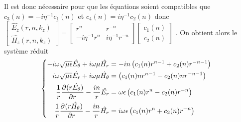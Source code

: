   Il est donc nécessaire pour que les équations soient compatibles que \(c_3(n)=-i\eta^{-1} c_1(n)\) et \(c_4(n) = i\eta^{-1}c_2(n)\) donc \(\begin{bmatrix}\hat{E_z}(r,n,k_z)\\\hat{H_z}(r,n,k_z)\end{bmatrix}=\begin{bmatrix}r^n&r^{-n}\\-i\eta^{-1}r^n&i\eta^{-1}r^{-n}\end{bmatrix}\begin{bmatrix}c_1(n)\\c_2(n)\end{bmatrix}\) . On obtient alors le système réduit
  \begin{align*}
      &\left\lbrace
      \begin{aligned}
        -i\w\sqrt{\mu\eps}\hat{E_\theta} + i\w\mu \hat{H_r} &= -{in}\left(c_1(n) r^{n-1} + c_2(n)r^{-n-1}\right)
        \\
        i\w\sqrt{\mu\eps}\hat{E_r} + i\w\mu \hat{H_\theta} &= \left(c_1(n)nr^{n-1} - c_2(n)nr^{-n-1}\right)
        \\
        \frac{1}{r}\ddr{r}{(r\hat{E_\theta})} - \frac{in}{r}{\hat{E_r}}  &= \w\eps \left(c_1(n) r^n - c_2(n)r^{-n}\right)
        \\
        \frac{1}{r}\ddr{r}{(r\hat{H_\theta})} - \frac{in}{r}{\hat{H_r}}  &=  i\w\eps \left(c_1(n) r^n + c_2(n)r^{-n}\right)  
      \end{aligned}
      \right.
  \end{align*}


